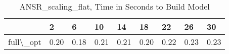 \begin{table}
\centering
\caption{ANSR\_scaling\_flat, Time in Seconds to Build Model}
\label{ANSR_scaling_flat_model_time}
\begin{tabular}{lllllllll}
\toprule
{} &     2 &     6 &    10 &    14 &    18 &    22 &    26 &    30 \\
\midrule
full\textbackslash \_opt &  0.20 &  0.18 &  0.21 &  0.21 &  0.20 &  0.22 &  0.23 &  0.23 \\
\bottomrule
\end{tabular}
\end{table}
